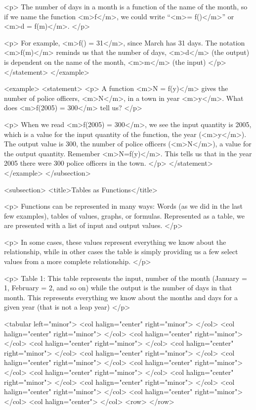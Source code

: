                 <p>
                    The number of days in a month is a function of the name of the month, so if we name the function <m>f</m>, we could write “<m>= f()</m>” or <m>d = f(m)</m>.
                </p>

                <p>
                    For example, <m>f() = 31</m>, since March has 31 days.
                    The notation <m>f(m)</m> reminds us that the number of days, <m>d</m> (the output) is dependent on the name of the month, <m>m</m> (the input)
                </p>
            </statement>
        </example>

        <example>
            <statement>
                <p>
                    A function <m>N = f(y)</m> gives the number of police officers, <m>N</m>, in a town in year <m>y</m>.
                    What does <m>f(2005) = 300</m> tell us?
                </p>

                <p>
                    When we read <m>f(2005) = 300</m>, we see the input quantity is 2005, which is a value for the input quantity of the function, the year (<m>y</m>).
                    The output value is 300, the number of police officers (<m>N</m>), a value for the output quantity.
                    Remember <m>N=f(y)</m>.
                    This tells us that in the year 2005 there were 300 police officers in the town.
                </p>
            </statement>
        </example>
    </subsection>


    <subsection>
        <title>Tables as Functions</title>

        <p>
            Functions can be represented in many ways: Words (as we did in the last few examples), tables of values, graphs, or formulas.
            Represented as a table, we are presented with a list of input and output values.
        </p>

        <p>
            In some cases, these values represent everything we know about the relationship, while in other cases the table is simply providing us a few select values from a more complete relationship.
        </p>

        <p>
            Table 1: This table represents the input, number of the month (January = 1, February = 2, and so on) while the output is the number of days in that month.
            This represents everything we know about the months and days for a given year (that is not a leap year)
        </p>

        <tabular left="minor">
            <col halign="center" right="minor"> </col> <col halign="center" right="minor"> </col> <col halign="center" right="minor"> </col> <col halign="center" right="minor"> </col> <col halign="center" right="minor"> </col> <col halign="center" right="minor"> </col> <col halign="center" right="minor"> </col> <col halign="center" right="minor"> </col> <col halign="center" right="minor"> </col> <col halign="center" right="minor"> </col> <col halign="center" right="minor"> </col> <col halign="center" right="minor"> </col> <col halign="center" right="minor"> </col> <col halign="center"> </col>
            <row>
            </row>

